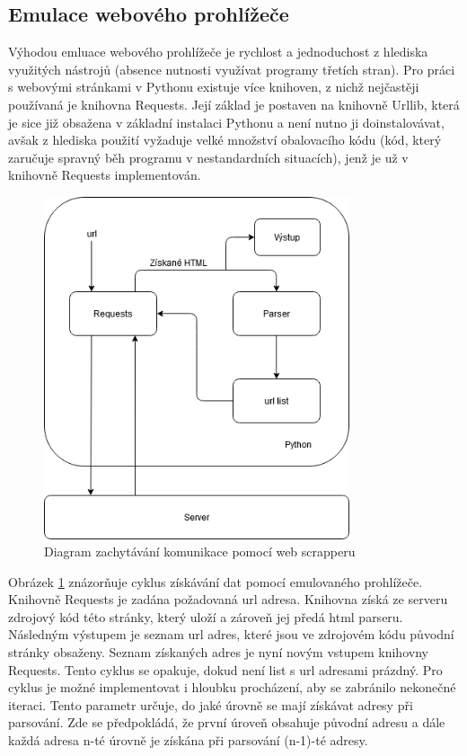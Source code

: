 \documentclass[thesis=M,czech,hidelinks]{FITthesis}[2013/05/06]
\begin{document}
\subsection{Emulace webového prohlížeče} \label{sec:parsing}
Výhodou emluace webového prohlížeče je rychlost a jednoduchost z hlediska využitých nástrojů (absence nutnosti využívat programy třetích stran). Pro práci s webovými stránkami v Pythonu existuje více knihoven, z nichž nejčastěji používaná je knihovna Requests. Její základ je postaven na knihovně Urllib, která je sice již obsažena v základní instalaci Pythonu a není nutno ji doinstalovávat, avšak z hlediska použití vyžaduje velké množství obalovacího kódu (kód, který zaručuje spravný běh programu v nestandardních situacích), jenž je už v knihovně  Requests implementován.

\begin{figure}[h]
	\centering
	\includegraphics[width=9cm]{pictures/scrapper.png}
	\caption{Diagram zachytávání komunikace pomocí web scrapperu}
	\label{fig:web_scrapper}
\end{figure}

Obrázek \ref{fig:web_scrapper} znázorňuje cyklus získávání dat pomocí emulovaného prohlížeče. Knihovně Requests je zadána požadovaná url adresa. Knihovna získá ze serveru zdrojový kód této stránky, který uloží a zároveň jej předá html parseru. Následným výstupem je seznam url adres, které jsou ve zdrojovém kódu původní stránky obsaženy. Seznam získaných adres je nyní novým vstupem knihovny Requests. Tento cyklus se opakuje, dokud není list s url adresami prázdný. Pro cyklus je možné implementovat i hloubku procházení, aby se zabránilo nekonečné iteraci. Tento parametr určuje, do jaké úrovně se mají získávat adresy při parsování. Zde se předpokládá, že první úroveň obsahuje původní adresu a dále každá adresa n-té úrovně je získána při parsování (n-1)-té adresy.
\end{document}
